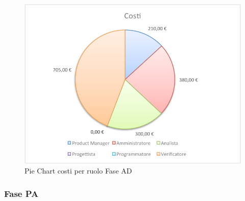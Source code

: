 				\begin{figure}[H]\centering
					\includegraphics[width=\textwidth]{PianoDiProgetto/Pics/ChartTotCostiFaseAD.pdf}
					\caption{Pie Chart costi per ruolo Fase AD}
				\end{figure}
		\subsubsection{Fase PA}
